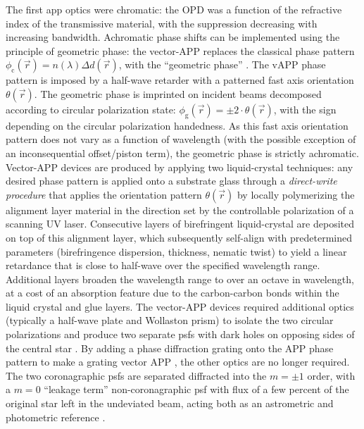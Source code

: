 \documentclass[letterpaper]{ar-1col}
\begin{document}
The first \ac{app} optics were chromatic: the OPD was a function of the refractive index of the transmissive material, with the suppression decreasing with increasing bandwidth.
%
Achromatic phase shifts can be implemented using the principle of geometric phase: the vector-APP \citep[vAPP; ][]{Snik12} replaces the classical phase pattern $\phi_{\textrm{c}}(\vec{r}) = n(\lambda) \Delta d(\vec{r})$,
with the ``geometric phase'' \citep[known as the Pancharatnam-Berry phase; ][]{Pancharatnam,Berry}.
%
The vAPP phase pattern is imposed by a half-wave retarder with a patterned fast axis orientation $\theta(\vec{r})$.
%
The geometric phase is imprinted on incident beams decomposed according to circular polarization state: $\phi_{\textrm{g}}(\vec{r}) = \pm2\cdot\theta(\vec{r})$, with the sign depending on the circular polarization handedness.
As this fast axis orientation pattern does not vary as a function of wavelength (with the possible exception of an inconsequential offset/piston term), the geometric phase is strictly achromatic.
%
Vector-APP devices are produced by applying two liquid-crystal techniques: any desired phase pattern is applied onto a substrate glass through a \textit{direct-write procedure} \citep{directwrite} that applies the orientation pattern $\theta(\vec{r})$ by locally polymerizing the alignment layer material in the direction set by the controllable polarization of a scanning UV laser.
%
Consecutive layers of birefringent liquid-crystal are deposited on top of this alignment layer, which subsequently self-align \citep[``\textit{Multi-Twist Retarders}''; MTR ][]{MTR} with predetermined parameters (birefringence dispersion, thickness, nematic twist) to yield a linear retardance that is close to half-wave over the specified wavelength range.
%
Additional layers broaden the wavelength range to over an octave in wavelength, at a cost of an absorption feature due to the carbon-carbon bonds within the liquid crystal and glue layers.
%
The vector-APP devices required additional optics (typically a half-wave plate and Wollaston prism) to isolate the two circular polarizations and produce two separate \acp{psf} with dark holes on opposing sides of the central star \citep{Snik12}.
%
By adding a phase diffraction grating onto the APP phase pattern to make a grating vector APP \citep[gvAPP; ][]{Snik12,Otten14}, the other optics are no longer required.
%
The two coronagraphic \acp{psf} are separated diffracted into the $m=\pm 1$ order, with a $m=0$ ``leakage term'' non-coronagraphic \ac{psf} with flux of a few percent of the original star left in the undeviated beam, acting both as an astrometric and photometric reference \citep{Otten17,Sutlieff24}.
\end{document}
